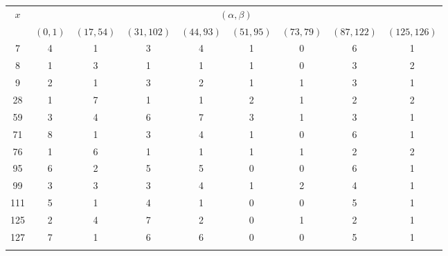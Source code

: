 \documentclass{ws-ijbc}
\begin{document}
\begin{table}[htbp]
{\begin{tabular}{c|*{7}{c}c}
\toprule
\multirow{2}{0.1in}{$x$} & \multicolumn{8}{c}{$(\alpha, \beta)$} \\
\cline{2-9} & $(0, 1)$ & $(17, 54)$ & $(31, 102)$ & $(44,93)$ & $(51, 95)$ & $(73, 79)$ & $(87, 122)$ & $(125, 126)$\\\hline
    7       &  4       &   1        &   3         & 4      &    1          &   0    &       6           &  1   \\
    8       &  1       &   3        &   1         &  1    &     1         &    0   &        3          &   2  \\
    9       &  2       &   1        &   3         &  2    &    1          &    1   &        3          &   1  \\
    28      &  1       &   7        &   1         &   1   &    2          &    1   &        2          &   2  \\
    59      &  3       &   4        &   6         &  7    &    3          &    1   &        3          &   1  \\
    71      &  8       &   1        &   3         & 4     &    1          &    0   &        6          &   1  \\
    76      &  1       &   6        &   1         &  1    &    1          &    1   &        2          &   2  \\
    95      &  6       &   2        &   5         & 5     &    0          &   0    &        6          &   1  \\
    99      &  3       &   3        &   3         & 4     &    1          &   2    &        4          &   1  \\
    111     &  5       &   1        &   4         & 1     &    0          &   0    &        5          &   1  \\
    125     &  2       &   4        &   7         & 2     &    0          &   1    &        2          &   1  \\
    127     &  7       &   1        &   6         & 6     &    0          &   0    &        5          &   1  \\[-4pt]
    \botrule
\end{tabular}}
\label{table:numbersolution}
\end{table}
\end{document}
